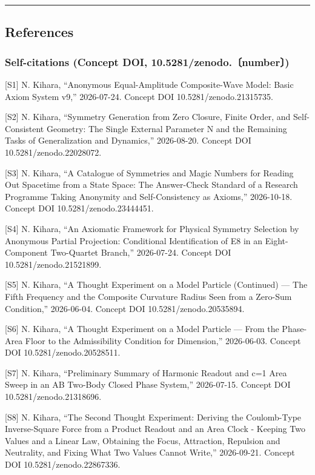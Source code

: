 \documentclass[
  a4paper,
]{article}
\begin{document}
\begin{center}\rule{0.5\linewidth}{0.5pt}\end{center}

\subsection{References}\label{references}

\subsubsection{Self-citations (Concept DOI,
10.5281/zenodo.〔number〕)}\label{self-citations-concept-doi-10.5281zenodo.number}

{[}S1{]} N. Kihara, ``Anonymous Equal-Amplitude Composite-Wave Model:
Basic Axiom System v9,'' 2026-07-24. Concept DOI
10.5281/zenodo.21315735.

{[}S2{]} N. Kihara, ``Symmetry Generation from Zero Closure, Finite
Order, and Self-Consistent Geometry: The Single External Parameter N and
the Remaining Tasks of Generalization and Dynamics,'' 2026-08-20.
Concept DOI 10.5281/zenodo.22028072.

{[}S3{]} N. Kihara, ``A Catalogue of Symmetries and Magic Numbers for
Reading Out Spacetime from a State Space: The Answer-Check Standard of a
Research Programme Taking Anonymity and Self-Consistency as Axioms,''
2026-10-18. Concept DOI 10.5281/zenodo.23444451.

{[}S4{]} N. Kihara, ``An Axiomatic Framework for Physical Symmetry
Selection by Anonymous Partial Projection: Conditional Identification of
E8 in an Eight-Component Two-Quartet Branch,'' 2026-07-24. Concept DOI
10.5281/zenodo.21521899.

{[}S5{]} N. Kihara, ``A Thought Experiment on a Model Particle
(Continued) --- The Fifth Frequency and the Composite Curvature Radius
Seen from a Zero-Sum Condition,'' 2026-06-04. Concept DOI
10.5281/zenodo.20535894.

{[}S6{]} N. Kihara, ``A Thought Experiment on a Model Particle --- From
the Phase-Area Floor to the Admissibility Condition for Dimension,''
2026-06-03. Concept DOI 10.5281/zenodo.20528511.

{[}S7{]} N. Kihara, ``Preliminary Summary of Harmonic Readout and c=1
Area Sweep in an AB Two-Body Closed Phase System,'' 2026-07-15. Concept
DOI 10.5281/zenodo.21318696.

{[}S8{]} N. Kihara, ``The Second Thought Experiment: Deriving the
Coulomb-Type Inverse-Square Force from a Product Readout and an Area
Clock - Keeping Two Values and a Linear Law, Obtaining the Focus,
Attraction, Repulsion and Neutrality, and Fixing What Two Values Cannot
Write,'' 2026-09-21. Concept DOI 10.5281/zenodo.22867336.
\end{document}
